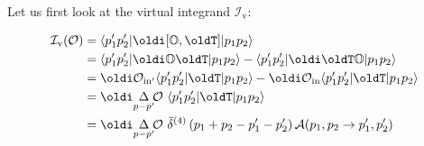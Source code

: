 \documentclass[
  letterpaper,
  DIV=11,
  numbers=noendperiod,
  oneside]{scrreprt}
\begin{document}
Let us first look at the virtual integrand \(\mathcal{I}_\text{v}\):

\[\begin{aligned}
\mathtip{\mathcal{I}_{\text{v}}(\mathtip{\mathcal{O}}{\text{Observable: }\mathcal{O}})}{\text{Virtual integrand: }\mathcal{I}_{\text{v}}(\mathtip{\mathcal{O}}{\text{Observable: }\mathcal{O}})}&=\mathtip{\langle p_1'p_2' \vert \oldi\mathtip{[\mathtip{\mathbb{O}}{\text{Operator: }\mathbb{O}},\oldT]}{\text{Commutator: }[\mathtip{\mathbb{O}}{\text{Operator: }\mathbb{O}},\oldT]} \vert p_1p_2 \rangle}{\text{Matrix element: }\langle p_1'p_2' \vert \oldi\mathtip{[\mathtip{\mathbb{O}}{\text{Operator: }\mathbb{O}},\oldT]}{\text{Commutator: }[\mathtip{\mathbb{O}}{\text{Operator: }\mathbb{O}},\oldT]} \vert p_1p_2 \rangle}  \\
      &=\mathtip{\langle p_1'p_2' \vert \oldi\mathtip{\mathbb{O}}{\text{Operator: }\mathbb{O}}\oldT \vert p_1p_2 \rangle}{\text{Matrix element: }\langle p_1'p_2' \vert \oldi\mathtip{\mathbb{O}}{\text{Operator: }\mathbb{O}}\oldT \vert p_1p_2 \rangle}   - \mathtip{\langle p_1'p_2' \vert \oldi\oldT\mathtip{\mathbb{O}}{\text{Operator: }\mathbb{O}}  \vert p_1p_2 \rangle}{\text{Matrix element: }\langle p_1'p_2' \vert \oldi\oldT\mathtip{\mathbb{O}}{\text{Operator: }\mathbb{O}}  \vert p_1p_2 \rangle}\\
      &=\oldi\mathtip{\mathcal{O}}{\text{Observable: }\mathcal{O}}_{\text{in}'} \mathtip{\langle p_1'p_2' \vert \oldT \vert p_1p_2 \rangle}{\text{Matrix element: }\langle p_1'p_2' \vert \oldT \vert p_1p_2 \rangle}- \oldi\mathtip{\mathcal{O}}{\text{Observable: }\mathcal{O}}_{\text{in}}\mathtip{\langle p_1'p_2' \vert \oldT \vert p_1p_2 \rangle}{\text{Matrix element: }\langle p_1'p_2' \vert \oldT \vert p_1p_2 \rangle}\\
      &=\oldi\mathtip{\underset{p-p'}{\Delta} \!\mathtip{\mathcal{O}}{\text{Observable: }\mathcal{O}}\,}{\text{Observable change: }\underset{p-p'}{\Delta} \!\mathtip{\mathcal{O}}{\text{Observable: }\mathcal{O}}\,} \, \mathtip{\langle p_1'p_2' \vert \oldT \vert p_1p_2 \rangle}{\text{Matrix element: }\langle p_1'p_2' \vert \oldT \vert p_1p_2 \rangle}\\
      &=\oldi\mathtip{\underset{p-p'}{\Delta} \!\mathtip{\mathcal{O}}{\text{Observable: }\mathcal{O}}\,}{\text{Observable change: }\underset{p-p'}{\Delta} \!\mathtip{\mathcal{O}}{\text{Observable: }\mathcal{O}}\,}\,\mathtip{\tilde{\delta}^{(4)}\left(p_1+p_2-p_1'-p_2'\right)}{\text 
{Normalized Dirac delta function: } \tilde{\delta}^{(4)}\left(p_1+p_2-p_1'-p_2'\right) = (2\pi)^{4}\delta^{4}\left(p_1+p_2-p_1'-p_2'\right)} \mathtip{\mathcal{A}(p_1,p_2\to p_1',p_2')}{\text{Amplitude: }\mathcal{A}(p_1,p_2\to p_1',p_2')}
\end{aligned}\]
\end{document}
